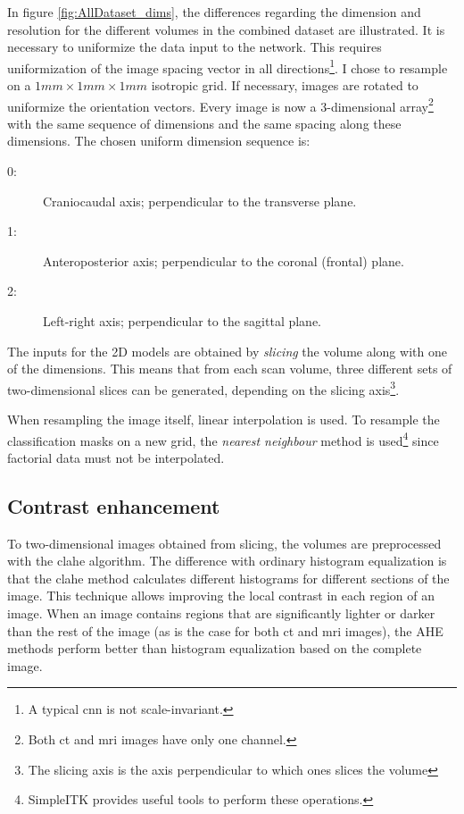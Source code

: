 In figure \ref{fig:AllDataset_dims}, the differences regarding the dimension and resolution for the different volumes in the combined dataset are illustrated. 
It is necessary to uniformize the data input to the network. 
This requires uniformization of the image spacing vector in all directions\footnote{A typical \acrshort{cnn} is not scale-invariant.}. 
I chose to resample on a $1mm\times 1mm \times 1mm$ isotropic grid. 
If necessary, images are rotated to uniformize the orientation vectors. 
Every image is now a 3-dimensional array\footnote{Both \acrshort{ct} and \acrshort{mri} images have only one channel.} with the same sequence of dimensions and the same spacing along these dimensions.
The chosen uniform dimension sequence is:
\begin{description} 
    \item[0:] Craniocaudal axis; perpendicular to the transverse plane.
    \item[1:] Anteroposterior axis; perpendicular to the coronal (frontal) plane.
    \item[2:] Left-right axis; perpendicular to the sagittal plane.
\end{description}
The inputs for the 2D models are obtained by \textit{slicing} the volume along with one of the dimensions.
This means that from each scan volume, three different sets of two-dimensional slices can be generated, depending on the slicing axis\footnote{The slicing axis is the axis perpendicular to which ones slices the volume}.

When resampling the image itself, linear interpolation is used. 
To resample the classification masks on a new grid, the \textit{nearest neighbour} method is used\footnote{
    SimpleITK \cite{sitk} provides useful tools to perform these operations.
    } 
since factorial data must not be interpolated. 

\subsection{Contrast enhancement}
To two-dimensional images obtained from slicing, the volumes are preprocessed with the \acrfull{clahe} algorithm. 
The difference with ordinary histogram equalization is that the \acrshort{clahe} method calculates different histograms for different sections of the image.
This technique allows improving the local contrast in each region of an image.
When an image contains regions that are significantly lighter or darker than the rest of the image (as is the case for both \acrshort{ct} and \acrshort{mri} images), the AHE methods perform better than histogram equalization based on the complete image.

